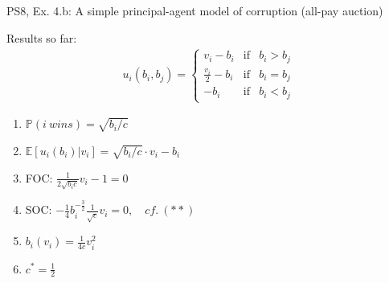 \begin{frame}{PS8, Ex. 4.b: A simple principal-agent model of corruption (all-pay auction)}
\begin{multicols}{2}
\begin{itemize}
      \end{itemize}
      \vspace{-6pt}
      Results so far: \vspace{-6pt}
      \begin{align*}
        u_i(b_i,b_j)=\left\{\begin{array}{lcl}
          v_i-b_i           & \text{if} & b_i>b_j \\
          \frac{v_i}{2}-b_i & \text{if} & b_i=b_j \\
          -b_i              & \text{if} & b_i<b_j
        \end{array}\right.
      \end{align*} \vspace{-16pt}
      \begin{enumerate}
        \item $\mathbb{P}(i\ wins)=\sqrt{b_i/c}$
        \item $\mathbb{E}[u_i(b_i)|v_i]=\sqrt{b_i/c}\cdot v_i-b_i$
        \item FOC: $\frac{1}{2\sqrt{b_ic}}v_i-1=0$
        \item[] SOC: $-\frac{1}{4}b_i^{-\frac{3}{2}}\frac{1}{\sqrt{c}}v_i=0,\quad cf.\ (**)$
        \item $b_i(v_i)=\frac{1}{4c}v_i^2$
        \item $c^*=\frac{1}{2}$
      \end{enumerate}
      \vfill\null
    \end{multicols}
\end{frame}

